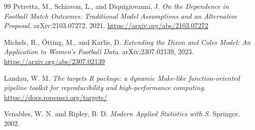 \documentclass[11pt]{article}
\begin{document}
\begin{thebibliography}{99}
Petretta, M., Schiavon, L., and Diquigiovanni, J. \emph{On the Dependence in
Football Match Outcomes: Traditional Model Assumptions and an Alternative
Proposal}. arXiv:2103.07272, 2021.
\url{https://arxiv.org/abs/2103.07272}

Michels, R., {\"O}tting, M., and Karlis, D. \emph{Extending the Dixon and Coles
Model: An Application to Women's Football Data}. arXiv:2307.02139, 2023.
\url{https://arxiv.org/abs/2307.02139}

Landau, W. M. \emph{The targets R package: a dynamic Make-like function-oriented
pipeline toolkit for reproducibility and high-performance computing}.
\url{https://docs.ropensci.org/targets/}

Venables, W. N. and Ripley, B. D. \emph{Modern Applied Statistics with S}.
Springer, 2002.
\end{thebibliography}
\end{document}
